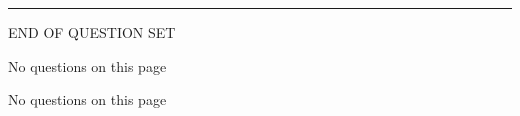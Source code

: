 \documentclass{report}
\begin{document}
\vspace*{0.5 cm}
\centering
\rule{10 cm}{0.4pt}

\Large
END OF QUESTION SET
\newpage

\vspace*{\fill}
\centering
\thispagestyle{empty}
\Large
No questions on this page
\vspace*{\fill}

\newpage

\vspace*{\fill}
\centering
\thispagestyle{empty}
\Large
No questions on this page
\vspace*{\fill}
\end{document}
